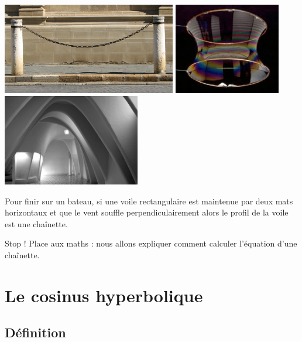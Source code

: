 \documentclass[class=report,crop=false]{standalone}
\begin{document}
{\centering
  \hspace*{-1.3cm}
  \includegraphics[height=4cm]{figures/Chainette_by_fdecomite.jpg} 
  \includegraphics[height=4cm]{figures/Bulle_Savon_by_soapbubble.jpg} 
  \includegraphics[height=4cm]{figures/Gaudi_by_Naveen_Jamal.jpg} 
}

\bigskip

Pour finir sur un bateau, si une voile rectangulaire est maintenue par deux
mats horizontaux et que le vent souffle perpendiculairement 
alors le profil de la voile est une chaînette. 

Stop ! Place aux maths : nous allons expliquer comment calculer l'équation d'une chaînette.





\section{Le cosinus hyperbolique}

\subsection{Définition}
\end{document}
